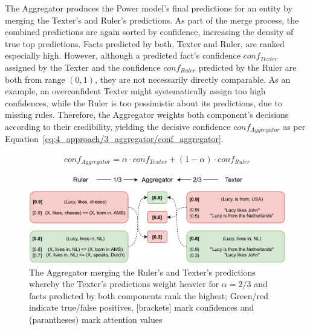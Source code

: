 The Aggregator produces the Power model's final predictions for an entity by merging the Texter's and Ruler's predictions. As part of the merge process, the combined predictions are again sorted by confidence, increasing the density of true top predictions. Facts predicted by both, Texter and Ruler, are ranked especially high. However, although a predicted fact's confidence $conf_{Texter}$ assigned by the Texter and the confidence $conf_{Ruler}$ predicted by the Ruler are both from range $(0, 1)$, they are not necessarily directly comparable. As an example, an overconfident Texter might systematically assign too high confidences, while the Ruler is too pessimistic about its predictions, due to missing rules. Therefore, the Aggregator weights both component's decisions according to their credibility, yielding the decisive confidence $conf_{Aggregator}$ as per Equation~\ref{eq:4_approach/3_aggregator/conf_aggregator}.

\begin{align}
    conf_{Aggregator} = \alpha \cdot conf_{Texter} + (1 - \alpha) \cdot conf_{Ruler}
    \label{eq:4_approach/3_aggregator/conf_aggregator}
\end{align}

\begin{figure}[t]
    \centering
    \includegraphics{4_approach/3_aggregator/lucy}
    \caption{The Aggregator merging the Ruler's and Texter's predictions whereby the Texter's predictions weight heavier for $\alpha = 2/3$ and facts predicted by both components rank the highest; Green/red indicate true/false positives, [brackets] mark confidences and (parantheses) mark attention values}
    \label{fig:4_approach/3_aggregator/lucy}
\end{figure}

